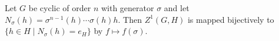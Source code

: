 Let $G$ be cyclic of order $n$ with generator $\sigma$ and let $N_\sigma(h) = \sigma^{n-1}(h) \cdots \sigma(h)h$. Then $Z^1(G, H)$ is mapped bijectively to $\{h \in H \mid N_\sigma(h) = e_H\}$ by $f \mapsto f(\sigma)$.
